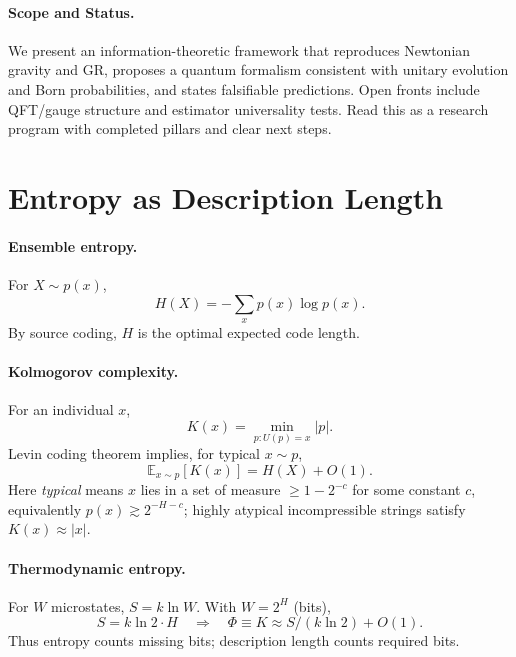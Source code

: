 \documentclass[aps,preprint,onecolumn,longbibliography,nofootinbib]{revtex4-2}
\numberwithin{equation}{section}
\begin{document}
\paragraph*{Scope and Status.}
We present an information-theoretic framework that reproduces Newtonian gravity and GR, proposes a quantum formalism consistent with unitary evolution and Born probabilities, and states falsifiable predictions. Open fronts include QFT/gauge structure and estimator universality tests. Read this as a research program with completed pillars and clear next steps.

\section{Entropy as Description Length}\label{sec:entropy}
\paragraph*{Ensemble entropy.}
For $X\sim p(x)$,
\begin{equation}
H(X)=-\sum_x p(x)\log p(x).\label{eq:shannon}
\end{equation}
By source coding, $H$ is the optimal expected code length.

\paragraph*{Kolmogorov complexity.}
For an individual $x$,
\begin{equation}
K(x)=\min_{p:U(p)=x}|p|.\label{eq:kolmogorov}
\end{equation}
Levin coding theorem implies, for typical $x\sim p$,
\begin{equation}
\mathbb{E}_{x\sim p}[K(x)]=H(X)+O(1).\label{eq:levinbridge}
\end{equation}
Here \emph{typical} means $x$ lies in a set of measure $\ge1-2^{-c}$ for some constant $c$, equivalently $p(x)\gtrsim2^{-H-c}$; highly atypical incompressible strings satisfy $K(x)\approx|x|$.

\paragraph*{Thermodynamic entropy.}
For $W$ microstates, $S=k\ln W$. With $W=2^{H}$ (bits),
\begin{equation}
S=k\ln2\cdot H\quad\Rightarrow\quad \Phi\equiv K\approx S/(k\ln2)+O(1).\label{eq:bridge}
\end{equation}
Thus entropy counts missing bits; description length counts required bits.
\end{document}
